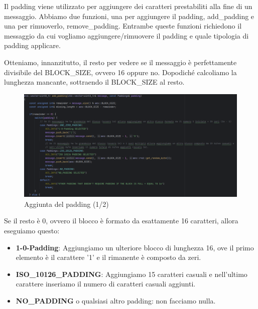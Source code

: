 \textsf{\small Il padding viene utilizzato per aggiungere dei caratteri prestabiliti alla fine di un messaggio. Abbiamo due funzioni, una per aggiungere il padding, add\_padding e una per rimuoverlo, remove\_padding. Entrambe queste funzioni richiedono il messaggio da cui vogliamo aggiungere/rimuovere il padding e quale tipologia di padding applicare.} %

\textsf{\small Otteniamo, innanzitutto, il resto per vedere se il messaggio è perfettamente divisibile del BLOCK\_SIZE, ovvero 16 oppure no. Dopodiché calcoliamo la lunghezza mancante, sottraendo il BLOCK\_SIZE al resto.}

\begin{figure}[H]
	\centering
	\includegraphics[width=1\textwidth, height=1\textheight, keepaspectratio]{./images/code/cpp/padding/add_padding0.PNG}
	\caption{Aggiunta del padding (1/2)}
	\label{fig:add_padding0}
\end{figure}

\textsf{\small Se il resto è 0, ovvero il blocco è formato da esattamente 16 caratteri, allora eseguiamo questo:}

\begin{itemize}
	\item \textsf{\small \textbf{1-0-Padding}: Aggiungiamo un ulteriore blocco di lunghezza 16, ove il primo elemento è il carattere '1' e il rimanente è composto da zeri.}
	\item \textsf{\small \textbf{ISO\_10126\_PADDING}: Aggiungiamo 15 caratteri casuali e nell'ultimo carattere inseriamo il numero di caratteri casuali aggiunti.}
	\item \textsf{\small \textbf{NO\_PADDING} o qualsiasi altro padding: non facciamo nulla.}
\end{itemize}

